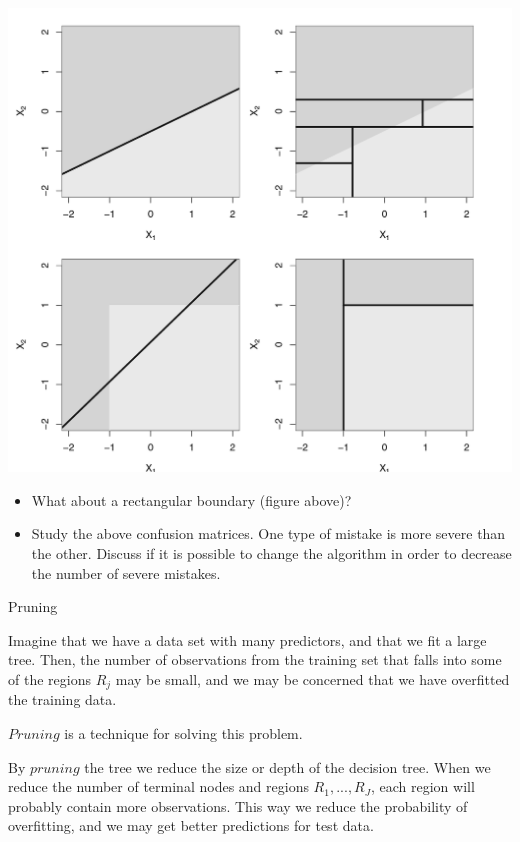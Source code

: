 \documentclass[10pt,ignorenonframetext,]{beamer}
\providecommand{\tightlist}{%
  \setlength{\itemsep}{0pt}\setlength{\parskip}{0pt}}
\begin{document}
\begin{frame}

\includegraphics{Introtostatlearn-326.png}

\end{frame}

\begin{frame}

\begin{itemize}
\tightlist
\item
  What about a rectangular boundary (figure above)?
\item
  Study the above confusion matrices. One type of mistake is more severe
  than the other. Discuss if it is possible to change the algorithm in
  order to decrease the number of severe mistakes.
\end{itemize}

\end{frame}

\begin{frame}{Pruning}

Imagine that we have a data set with many predictors, and that we fit a
large tree. Then, the number of observations from the training set that
falls into some of the regions \(R_j\) may be small, and we may be
concerned that we have overfitted the training data.

\(Pruning\) is a technique for solving this problem.

By \(pruning\) the tree we reduce the size or depth of the decision
tree. When we reduce the number of terminal nodes and regions
\(R_1,...,R_J\), each region will probably contain more observations.
This way we reduce the probability of overfitting, and we may get better
predictions for test data.

\end{frame}
\end{document}
